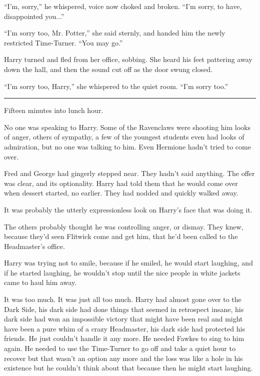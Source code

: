 ``I'm, sorry,'' he whispered, voice now choked and broken. ``I'm sorry,
to have, disappointed you...''

``I'm sorry too, Mr. Potter,'' she said sternly, and handed him the
newly restricted Time-Turner. ``You may go.''

Harry turned and fled from her office, sobbing. She heard his feet
pattering away down the hall, and then the sound cut off as the door
swung closed.

``I'm sorry too, Harry,'' she whispered to the quiet room. ``I'm sorry
too.''

\begin{center}\rule{3in}{0.4pt}\end{center}

Fifteen minutes into lunch hour.

No one was speaking to Harry. Some of the Ravenclaws were shooting him
looks of anger, others of sympathy, a few of the youngest students even
had looks of admiration, but no one was talking to him. Even Hermione
hadn't tried to come over.

Fred and George had gingerly stepped near. They hadn't said anything.
The offer was clear, and its optionality. Harry had told them that he
would come over when dessert started, no earlier. They had nodded and
quickly walked away.

It was probably the utterly expressionless look on Harry's face that was
doing it.

The others probably thought he was controlling anger, or dismay. They
knew, because they'd seen Flitwick come and get him, that he'd been
called to the Headmaster's office.

Harry was trying not to smile, because if he smiled, he would start
laughing, and if he started laughing, he wouldn't stop until the nice
people in white jackets came to haul him away.

It was too much. It was just all too much. Harry had almost gone over to
the Dark Side, his dark side had done things that seemed in retrospect
insane, his dark side had won an impossible victory that might have been
real and might have been a pure whim of a crazy Headmaster, his dark
side had protected his friends. He just couldn't handle it any more. He
needed Fawkes to sing to him again. He needed to use the Time-Turner to
go off and take a quiet hour to recover but that wasn't an option any
more and the loss was like a hole in his existence but he couldn't think
about that because then he might start laughing.


